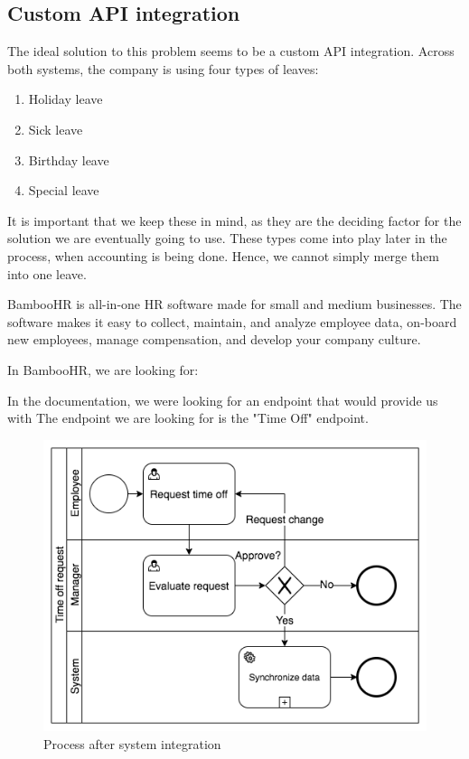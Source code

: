 \documentclass[12pt,oneside]{fithesis2}
\begin{document}
\subsection*{Custom API integration}
The ideal solution to this problem seems to be a custom API integration. 
\newline\newline
Across both systems, the company is using four types of leaves:
\begin{enumerate}
    \setlength\itemsep{0em}
    \item Holiday leave
    \item Sick leave
    \item Birthday leave
    \item Special leave
\end{enumerate}
It is important that we keep these in mind, as they are the deciding factor for the solution we are eventually going to use. These types come into play later in the process, when accounting is being done. Hence, we cannot simply merge them into one leave.

BambooHR is all-in-one HR software made for small and medium businesses. The software makes it easy to collect, maintain, and analyze employee data, on-board new employees, manage compensation, and develop your company culture.\cite{bambooHR}

In BambooHR, we are looking for: 

In the documentation, we were looking for an endpoint that would provide us with 
The endpoint we are looking for is the "Time Off" endpoint.


\begin{figure}[H]
    \centering
    \includegraphics[width=\textwidth]{after_sys_integration.png}
    \caption{Process after system integration}
    \label{fig:after_sys_integration}
\end{figure}
\end{document}
